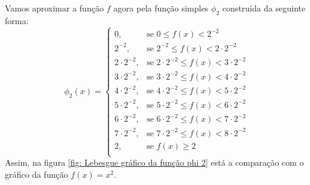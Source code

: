 \begin{figure}[h!]
{
		
	}{
	}   
\end{figure}
Vamos aproximar a função $f$ agora pela função simples $\phi_2$ construída da seguinte forma:
$$
\phi_2(x) =\left\{
\begin{array}{ll}
	0, & \textrm{se\ } 0 \leq f(x) < 2^{-2} \\
	2^{-2}, & \textrm{se\ } 2^{-2} \leq f(x) < 2\cdot2^{-2} \\
	2\cdot 2^{-2}, & \textrm{se\ } 2\cdot 2^{-2} \leq f(x) < 3\cdot2^{-2}\\
	3\cdot 2^{-2}, & \textrm{se\ } 3\cdot 2^{-2} \leq f(x) < 4\cdot2^{-2}\\
	4\cdot 2^{-2}, & \textrm{se\ } 4\cdot 2^{-2} \leq f(x) < 5\cdot2^{-2}\\
	5\cdot 2^{-2}, & \textrm{se\ } 5\cdot 2^{-2} \leq f(x) < 6\cdot2^{-2}\\
	6\cdot 2^{-2}, & \textrm{se\ } 6\cdot 2^{-2} \leq f(x) < 7\cdot2^{-2}\\
	7\cdot 2^{-2}, & \textrm{se\ } 7\cdot 2^{-2} \leq f(x) < 8\cdot2^{-2}\\
	2, & \textrm{se\ } f(x) \geq 2\\
\end{array}
\right.
$$
Assim, na figura \ref{fig: Lebesgue gráfico da função phi 2} está a comparação com o gráfico da função $f(x) = x^2$.
